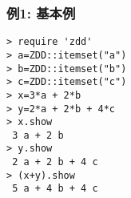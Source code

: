 \subsubsection*{例1: 基本例}



\begin{Verbatim}[baselinestretch=0.7,frame=single]
> require 'zdd'
> a=ZDD::itemset("a")
> b=ZDD::itemset("b")
> c=ZDD::itemset("c")
> x=3*a + 2*b
> y=2*a + 2*b + 4*c
> x.show
 3 a + 2 b
> y.show
 2 a + 2 b + 4 c
> (x+y).show
 5 a + 4 b + 4 c
\end{Verbatim}
